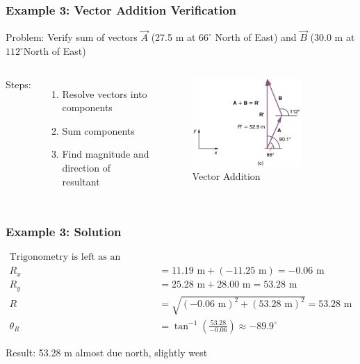 \documentclass{beamer}
\begin{document}
\begin{frame}
\frametitle{Example 3: Vector Addition Verification}
Problem: Verify sum of vectors $\vec{A}$ (27.5 m at $66^\circ$ North of East) and $\vec{B}$ (30.0 m at $112^\circ$North of East)

\begin{columns}
Steps:
\begin{enumerate}
\item Resolve vectors into components
\item Sum components
\item Find magnitude and direction of resultant
\end{enumerate}

\begin{figure}
\centering
\includegraphics[width=0.8\textwidth]{phys12-vectors-vector-diagram-3-23.png}
\caption{Vector Addition}
\end{figure}
\end{columns}
\end{frame}

\begin{frame}
\frametitle{Example 3: Solution}
\begin{align*}
\text {Trigonometry is left as an exercise.} \\
R_x &= 11.19 \text{ m} + (-11.25 \text{ m}) = -0.06 \text{ m} \\
R_y &= 25.28 \text{ m} + 28.00 \text{ m} = 53.28 \text{ m} \\
R &= \sqrt{(-0.06 \text{ m})^2 + (53.28 \text{ m})^2} = 53.28 \text{ m} \\
\theta_R &= \tan^{-1} \left( \frac{53.28}{-0.06} \right) \approx -89.9^\circ
\end{align*}

Result: 53.28 m almost due north, slightly west
\end{frame}
\end{document}

